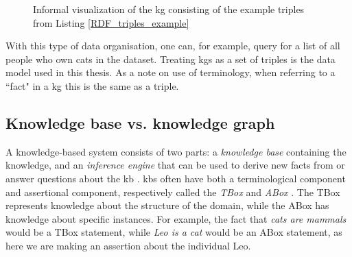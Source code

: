 \begin{figure}[htbp]
\centering
{}

\caption[Visualization of RDF triple example in listing \ref{RDF_triples_example}]{Informal visualization of the \gls{kg} consisting of the example triples from Listing \ref{RDF_triples_example}} \label{fig:KG_example_2}
\end{figure}

With this type of data organisation, one can, for example, query for a list of all people who own cats in the dataset. Treating \glspl{kg} as a set of triples is the data model used in this thesis. As a note on use of terminology, when referring to a ``fact" in a \gls{kg} this is the same as a triple.


\subsection{Knowledge base vs. knowledge graph}
A knowledge-based system consists of two parts: a \textit{knowledge base} containing the knowledge, and an \textit{inference engine} that can be used to derive new facts from or answer questions about the \gls{kb} \cite{akerkar2009knowledge}. \glspl{kb} often have both a terminological component and assertional component, respectively called the \textit{TBox} and \textit{ABox} \cite{brachman1989overview}. The TBox represents knowledge about the structure of the domain, while the ABox has knowledge about specific instances. For example, the fact that \emph{cats are  mammals} would be a TBox statement, while \emph{Leo is a cat} would be an ABox statement, as here we are making an assertion about the individual Leo.

